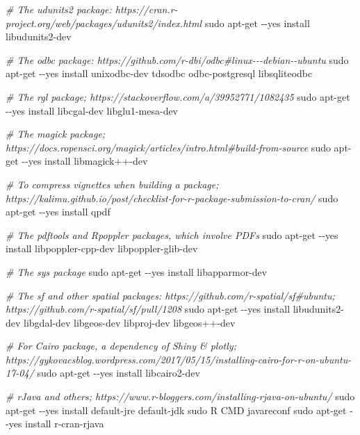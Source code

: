 \documentclass[
]{book}
\newenvironment{Shaded}{\begin{snugshade}}{\end{snugshade}}
\newcommand{\CommentTok}[1]{\textcolor[rgb]{0.56,0.35,0.01}{\textit{#1}}}
\newcommand{\FunctionTok}[1]{\textcolor[rgb]{0.00,0.00,0.00}{#1}}
\newcommand{\NormalTok}[1]{#1}
\newcommand{\StringTok}[1]{\textcolor[rgb]{0.31,0.60,0.02}{#1}}
\begin{document}
\begin{Shaded}
\begin{Highlighting}[]
  \CommentTok{\# The \textquotesingle{}udunits2\textquotesingle{} package: https://cran.r{-}project.org/web/packages/udunits2/index.html}
  \FunctionTok{sudo}\NormalTok{ apt{-}get {-}{-}yes install libudunits2{-}dev}

  \CommentTok{\# The \textquotesingle{}odbc\textquotesingle{} package: https://github.com/r{-}dbi/odbc\#linux{-}{-}{-}debian{-}{-}ubuntu}
  \FunctionTok{sudo}\NormalTok{ apt{-}get {-}{-}yes install unixodbc{-}dev tdsodbc odbc{-}postgresql libsqliteodbc}

  \CommentTok{\# The \textquotesingle{}rgl\textquotesingle{} package; https://stackoverflow.com/a/39952771/1082435}
  \FunctionTok{sudo}\NormalTok{ apt{-}get {-}{-}yes install libcgal{-}dev libglu1{-}mesa{-}dev}

  \CommentTok{\# The \textquotesingle{}magick\textquotesingle{} package; https://docs.ropensci.org/magick/articles/intro.html\#build{-}from{-}source}
  \FunctionTok{sudo}\NormalTok{ apt{-}get {-}{-}yes install }\StringTok{\textquotesingle{}libmagick++{-}dev\textquotesingle{}}

  \CommentTok{\# To compress vignettes when building a package; https://kalimu.github.io/post/checklist{-}for{-}r{-}package{-}submission{-}to{-}cran/}
  \FunctionTok{sudo}\NormalTok{ apt{-}get {-}{-}yes install qpdf}

  \CommentTok{\# The \textquotesingle{}pdftools\textquotesingle{} and \textquotesingle{}Rpoppler\textquotesingle{} packages, which involve PDFs}
  \FunctionTok{sudo}\NormalTok{ apt{-}get {-}{-}yes install libpoppler{-}cpp{-}dev libpoppler{-}glib{-}dev}

  \CommentTok{\# The \textquotesingle{}sys\textquotesingle{} package}
  \FunctionTok{sudo}\NormalTok{ apt{-}get {-}{-}yes install libapparmor{-}dev}

  \CommentTok{\# The \textquotesingle{}sf\textquotesingle{} and other spatial packages: https://github.com/r{-}spatial/sf\#ubuntu; https://github.com/r{-}spatial/sf/pull/1208}
  \FunctionTok{sudo}\NormalTok{ apt{-}get {-}{-}yes install libudunits2{-}dev libgdal{-}dev libgeos{-}dev libproj{-}dev libgeos++{-}dev}

  \CommentTok{\# For Cairo package, a dependency of Shiny \& plotly; https://gykovacsblog.wordpress.com/2017/05/15/installing{-}cairo{-}for{-}r{-}on{-}ubuntu{-}17{-}04/}
  \FunctionTok{sudo}\NormalTok{ apt{-}get {-}{-}yes install libcairo2{-}dev}

  \CommentTok{\# \textquotesingle{}rJava\textquotesingle{} and others; https://www.r{-}bloggers.com/installing{-}rjava{-}on{-}ubuntu/}
  \FunctionTok{sudo}\NormalTok{ apt{-}get {-}{-}yes install default{-}jre default{-}jdk}
  \FunctionTok{sudo}\NormalTok{ R CMD javareconf}
  \FunctionTok{sudo}\NormalTok{ apt{-}get {-}{-}yes install r{-}cran{-}rjava}


\end{Highlighting}
\end{Shaded}
\end{document}
